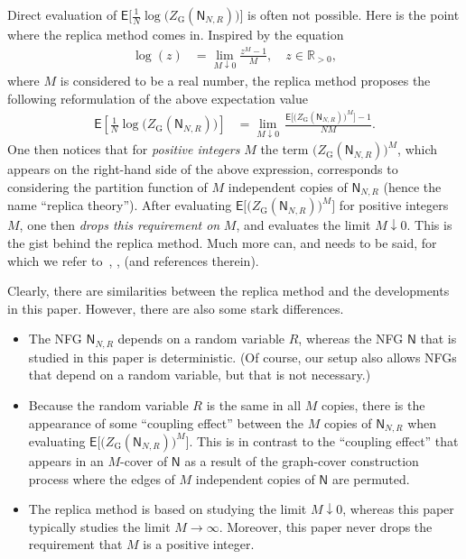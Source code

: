 \documentclass[journal, twocolumn]{IEEEtran}
\newcommand{\Rpp}{\mathbb{R}_{>0}}
\newcommand{\Expec}{\mathsf{E}}
\newcommand{\graph}[1]{\mathsf{#1}}
\newcommand{\graphN}{\graph{N}}
\newcommand{\?}{\mathrm{?}}
\newcommand{\ZGibbsext}[1]{Z_{\mathrm{G}}(#1)}
\begin{document}
Direct evaluation of $\Expec \bigl[ \frac{1}{N} \log \bigl(
\ZGibbsext{\graphN_{N,R}} \bigr) \bigr]$ is often not possible. Here is the
point where the replica method comes in. Inspired by the equation
\begin{align*}
  \log(z)
    &= \lim_{M \downarrow 0}
         \frac{z^M - 1}
              {M},
           \quad z \in \Rpp,
\end{align*}
where $M$ is considered to be a real number, the replica method proposes the
following reformulation of the above expectation value
\begin{align*}
  \Expec
    \left[
      \frac{1}{N}
      \log
        \big(
          \ZGibbsext{\graphN_{N,R}}
        \big)
    \right]
    &= \lim_{M \downarrow 0} \, 
         \frac{\Expec\Big[ \big( \ZGibbsext{\graphN_{N,R}} \big)^M \Big]
               -
               1}
              {N M}.
\end{align*}
One then notices that for \emph{positive integers} $M$ the term $\bigl(
\ZGibbsext{\graphN_{N,R}} \bigr)^M$, which appears on the right-hand side of
the above expression, corresponds to considering the partition function of $M$
independent copies of $\graphN_{N,R}$ (hence the name ``replica
theory''). After evaluating $\Expec\bigl[ \bigl( \ZGibbsext{\graphN_{N,R}}
\bigr)^M \bigr]$ for positive integers $M$, one then \emph{drops this
  requirement on} $M$, and evaluates the limit $M \downarrow 0$. This is the
gist behind the replica method. Much more can, and needs to be said, for which
we refer to~\cite{Mezard:Parisi:Virasoro:87:1},
\cite[Chapter~8]{Mezard:Montanari:09:1}, \cite[Appendix~I]{Tanaka:02:1} (and
references therein).

Clearly, there are similarities between the replica method and the
developments in this paper. However, there are also some stark differences.
\begin{itemize}

\item The NFG $\graphN_{N,R}$ depends on a random variable
  $R$, whereas the NFG $\graphN$ that is studied in this paper
  is deterministic. (Of course, our setup also allows NFGs
  that depend on a random variable, but that is not necessary.)

\item Because the random variable $R$ is the same in all $M$ copies, there is
  the appearance of some ``coupling effect'' between the $M$ copies of
  $\graphN_{N,R}$ when evaluating $\Expec\bigl[ \bigl(
  \ZGibbsext{\graphN_{N,R}} \bigr)^M \bigr]$. This is in contrast to the
  ``coupling effect'' that appears in an $M$-cover of $\graphN$ as a result of
  the graph-cover construction process where the edges of $M$ independent
  copies of $\graphN$ are permuted.

\item The replica method is based on studying the limit $M \downarrow 0$,
  whereas this paper typically studies the limit $M \to \infty$. Moreover,
  this paper never drops the requirement that $M$ is a positive integer.


\end{itemize}
\end{document}
